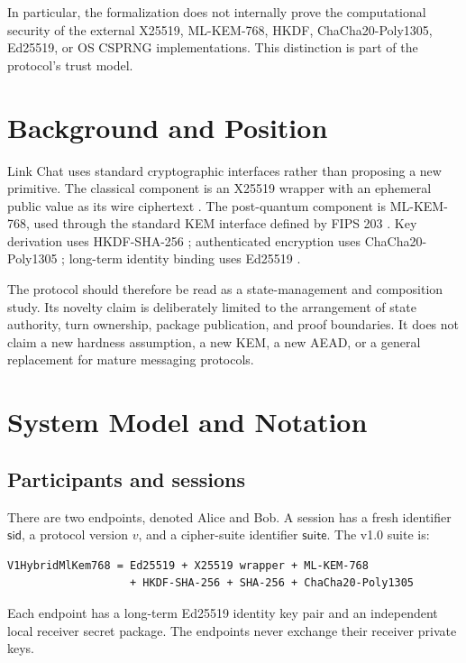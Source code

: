 \documentclass[11pt,letterpaper]{article}
\begin{document}
In particular, the formalization does not internally prove the computational security of
the external X25519, ML-KEM-768, HKDF, ChaCha20-Poly1305, Ed25519, or OS CSPRNG
implementations. This distinction is part of the protocol's trust model.

\section{Background and Position}
\label{sec:background}

Link Chat uses standard cryptographic interfaces rather than proposing a new primitive.
The classical component is an X25519 wrapper with an ephemeral public value as its wire
ciphertext \cite{rfc7748}. The post-quantum component is ML-KEM-768, used through the
standard KEM interface defined by FIPS 203 \cite{fips203}. Key derivation uses HKDF-SHA-256
\cite{rfc5869}; authenticated encryption uses ChaCha20-Poly1305 \cite{rfc8439}; long-term
identity binding uses Ed25519 \cite{rfc8032}.

The protocol should therefore be read as a state-management and composition study. Its
novelty claim is deliberately limited to the arrangement of state authority, turn
ownership, package publication, and proof boundaries. It does not claim a new hardness
assumption, a new KEM, a new AEAD, or a general replacement for mature messaging
protocols.

\section{System Model and Notation}
\label{sec:model}

\subsection{Participants and sessions}

There are two endpoints, denoted Alice and Bob. A session has a fresh identifier
$\mathsf{sid}$, a protocol version $v$, and a cipher-suite identifier $\mathsf{suite}$.
The v1.0 suite is:

\begin{lstlisting}[caption={The frozen v1.0 cipher suite}]
V1HybridMlKem768 = Ed25519 + X25519 wrapper + ML-KEM-768
                   + HKDF-SHA-256 + SHA-256 + ChaCha20-Poly1305
\end{lstlisting}

Each endpoint has a long-term Ed25519 identity key pair and an independent local receiver
secret package. The endpoints never exchange their receiver private keys.
\end{document}
